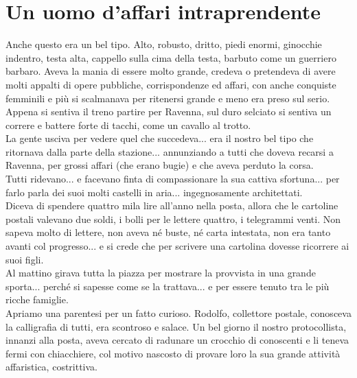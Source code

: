 
\chapter{Un uomo d'affari intraprendente}
Anche questo era un bel tipo. Alto, robusto, dritto, piedi enormi, ginocchie indentro, testa alta, cappello sulla cima della testa, barbuto come un guerriero barbaro. Aveva la mania di essere molto grande, credeva o pretendeva di avere molti appalti di opere pubbliche, corrispondenze ed affari, con anche conquiste femminili e più si scalmanava per ritenersi grande e meno era preso sul serio.\\
Appena si sentiva il treno partire per Ravenna, sul duro selciato si sentiva un correre e battere forte di tacchi, come un cavallo al trotto.\\
La gente usciva per vedere quel che succedeva... era il nostro bel tipo che ritornava dalla parte della stazione... annunziando a tutti che doveva recarsi a Ravenna, per grossi affari (che erano bugie) e che aveva perduto la corsa.\\
Tutti ridevano... e facevano finta di compassionare la sua cattiva sfortuna... per farlo parla dei suoi molti castelli in aria... ingegnosamente architettati.\\
Diceva di spendere quattro mila lire all'anno nella posta, allora che le cartoline postali valevano due soldi, i bolli per le lettere quattro, i telegrammi venti. Non sapeva molto di lettere, non aveva né buste, né carta intestata, non era tanto avanti col progresso... e si crede che per scrivere una cartolina dovesse ricorrere ai suoi figli. \\
Al mattino girava tutta la piazza per mostrare la provvista in una grande sporta... perché si sapesse come se la trattava... e per essere tenuto tra le più ricche famiglie.\\
Apriamo una parentesi per un fatto curioso. Rodolfo, collettore postale, conosceva la calligrafia di tutti, era scontroso e salace. Un bel giorno il nostro protocollista, innanzi alla posta, aveva cercato di radunare un crocchio di conoscenti e li teneva fermi con chiacchiere, col motivo nascosto di provare loro la sua grande attività affaristica, costrittiva. \\

